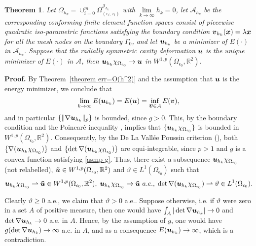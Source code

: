 \documentclass[12pt]{article}
\renewcommand{\vec}[1]{\mbox{\boldmath$#1$}}
\newtheorem{theorem}{Theorem}[section]
\numberwithin{equation}{section}
\begin{document}
\begin{theorem}
Let $\Omega_{h_k}=\cup_{i=0}^m \Omega^{\mathcal{J}_{h_k}}_{(\epsilon_i, \tau_i)}$ with
$\lim\limits_{k \rightarrow \infty}h_k = 0$, let $\mathcal{A}_{h_k}$ be the corresponding
conforming finite element function spaces consist of piecewise quadratic iso-parametric
functions satisfying the boundary condition $\vec{v}_{h_k}(\vec{x})=\lambda \vec{x}$ for
all the mesh nodes on the boundary $\Gamma_0$, and let $\vec{u}_{h_k}$ be a minimizer
of $E(\cdot)$ in $\mathcal{A}_{h_k}$. Suppose that the radially symmetric cavity
deformation $\vec{u}$
is the unique minimizer of $E(\cdot)$ in $\mathcal{A}$, then
$\vec{u}_{h_k}\chi_{\Omega_{\epsilon_0}} \rightarrow \vec{u}$ in
$W^{1,p}(\Omega_{\epsilon_0},\mathbb{R}^2)$.
\end{theorem}
\textbf{Proof.} By Theorem~\ref{theorem err=O(h^2)} and the assumption that
$\vec{u}$ is the energy minimizer, we conclude that
\begin{equation}\label{FEMenergyconverges}
\lim_{k \rightarrow \infty} E(\vec{u}_{h_k}) = E(\vec{u}) =
\inf_{\vec{v}\in \mathcal{A}} E(\vec{v}),
\end{equation}
and in particular $\{\|\nabla \vec{u}_{h_k}\|_p\}$ is bounded, since $g> 0$.
This, by the boundary condition and the Poincar\'{e} inequality \cite{Morrey},
implies that $\{\vec{u}_{h_k}\chi_{\Omega_{\epsilon_0}}\}$ is bounded in
$W^{1,p}(\Omega_{\epsilon_0},\mathbb{R}^{2})$. Consequently, by the
De La Vall\'{e}e Poussin
criterion (\cite{Meyer}), both $\{\nabla (\vec{u}_{h_k}\chi_{\Omega_{\epsilon_0}})\}$ and
$\{\det \nabla (\vec{u}_{h_k}\chi_{\Omega_{\epsilon_0}})\}$ are equi-integrable,
since $p>1$ and $g$ is a convex function satisfying \eqref{asmp g}.
Thus, there exist a subsequence $\vec{u}_{h_k}\chi_{\Omega_{\epsilon_0}}$ (not relabelled),
$\vec{\tilde{u}} \in W^{1,p}(\Omega_{\epsilon_0},\mathbb{R}^{2})$ and
$\vartheta \in L^1(\Omega_{\epsilon_0})$ such that
$$
\vec{u}_{h_k}\chi_{\Omega_{\epsilon_0}} \rightharpoonup \vec{\tilde{u}} \in
W^{1,p}(\Omega_{\epsilon_0},\mathbb{R}^2), \; \vec{u}_{h_k}\chi_{\Omega_{\epsilon_0}}
\rightarrow \vec{\tilde{u}}~a.e., \; \det \nabla (\vec{u}_{h_k}\chi_{\Omega_{\epsilon_0}})
\rightharpoonup \vartheta \in L^1(\Omega_{\epsilon_0}).
$$

Clearly $\vartheta \ge 0$ a.e., we claim that $\vartheta >0$ a.e..
Suppose otherwise, i.e. if $\vartheta$ were zero in a
set $A$ of positive measure, then one would have $\int_A |\det \nabla
\vec{u}_{h_k}| \rightarrow 0$ and $\det \nabla \vec{u}_{h_k} \rightarrow 0$ a.e.
in $A$. Hence, by the assumption of $g$, one would have
$g(\det \nabla \vec{u}_{h_k})\rightarrow \infty$ a.e. in $A$, and as a consequence
$E(\vec{u}_{h_k}) \rightarrow \infty$, which is a contradiction.
\end{document}
